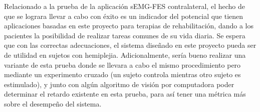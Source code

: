 Relacionado a la prueba de la aplicación sEMG-FES contralateral, el hecho de que se lograra llevar a cabo con éxito es un indicador del potencial que tienen aplicaciones basadas en este proyecto para terapias de rehabilitación, dando a los pacientes la posibilidad de realizar tareas comunes de su vida diaria. Se espera que con las correctas adecuaciones, el sistema diseñado en este proyecto pueda ser de utilidad en sujetos con hemiplejia. Adicionalmente, sería bueno realizar una variante de esta prueba donde se llevara a cabo el mismo procedimiento pero mediante un experimento cruzado (un sujeto controla mientras otro sujeto es estimulado), y junto con algún algoritmo de visión por computadora poder determinar el retardo existente en esta prueba, para así tener una métrica más sobre el desempeño del sistema.


